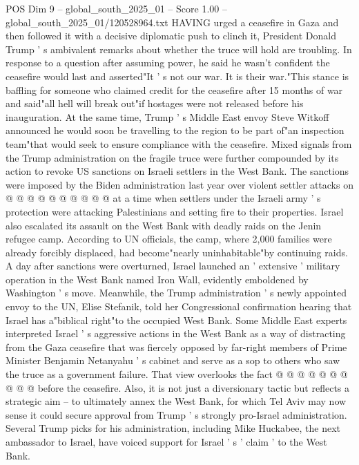 \begin{textsample}{POS Dim 9 – global\_south\_2025\_01 – Score 1.00 – global\_south\_2025\_01/120528964.txt}  \label{ex:f9_pos_308}
HAVING urged a ceasefire in Gaza and then followed it with a decisive diplomatic push to clinch it, President Donald Trump ' s ambivalent remarks about whether the truce will hold are troubling.
In response to a question after assuming power, he said he wasn't confident the ceasefire would last and asserted"It ' s not our war.
It is their war."This stance is baffling for someone who claimed credit for the ceasefire after 15 months of war and said"all hell will break out"if hostages were not released before his inauguration.
At the same time, Trump ' s Middle East envoy Steve Witkoff announced he would soon be travelling to the region to be part of"an inspection team"that would seek to ensure compliance with the ceasefire.
Mixed signals from the Trump administration on the fragile truce were further compounded by its action to revoke US sanctions on Israeli settlers in the West Bank.
The sanctions were imposed by the Biden administration last year over violent settler attacks on @ @ @ @ @ @ @ @ @ @ at a time when settlers under the Israeli army ' s protection were attacking Palestinians and setting fire to their properties.
Israel also escalated its assault on the West Bank with deadly raids on the Jenin refugee camp.
According to UN officials, the camp, where 2,000 families were already forcibly displaced, had become"nearly uninhabitable"by continuing raids.
A day after sanctions were overturned, Israel launched an ' extensive ' military operation in the West Bank named Iron Wall, evidently emboldened by Washington ' s move.
Meanwhile, the Trump administration ' s newly appointed envoy to the UN, Elise Stefanik, told her Congressional confirmation hearing that Israel has a"biblical right"to the occupied West Bank.
Some Middle East experts interpreted Israel ' s aggressive actions in the West Bank as a way of distracting from the Gaza ceasefire that was fiercely opposed by far-right members of Prime Minister Benjamin Netanyahu ' s cabinet and serve as a sop to others who saw the truce as a government failure.
That view overlooks the fact @ @ @ @ @ @ @ @ @ @ before the ceasefire.
Also, it is not just a diversionary tactic but reflects a strategic aim -- to ultimately annex the West Bank, for which Tel Aviv may now sense it could secure approval from Trump ' s strongly pro-Israel administration.
Several Trump picks for his administration, including Mike Huckabee, the next ambassador to Israel, have voiced support for Israel ' s ' claim ' to the West Bank.

\end{textsample}
